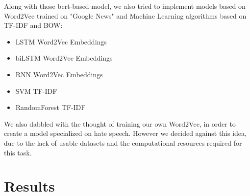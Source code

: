 \documentclass[11pt]{article}
\begin{document}
\begin{enumerate}
Along with those bert-based model, we also tried to implement models based on Word2Vec\cite{goldberg2014word2vec}
trained on "Google News" and Machine Learning algorithms based on TF-IDF and BOW:

\begin{itemize}
    \item LSTM Word2Vec Embeddings \cite{staudemeyer2019understanding}
    \item biLSTM Word2Vec Embeddings \cite{huang2015bidirectional}
    \item RNN Word2Vec Embeddings \cite{rnn}
    \item SVM TF-IDF
    \item RandomForest TF-IDF
\end{itemize}



We also dabbled with the thought of training our own Word2Vec, in order to create a model specialized on hate speech. However we decided against this idea, due to the lack of usable datasets and the computational resources required for this task.


\end{enumerate}


\section{Results}
\end{document}
